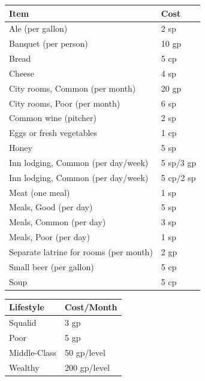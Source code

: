 \begin{multicols}{2}
\noindent
\begin{minipage}{\columnwidth}

\label{provisions}
\noindent
\begin{tabular}{|p{}|p{}|}
\hline
Item				& Cost \\
\hline\hline
\rowcolor[gray]{.9}Ale (per gallon)		& 2 sp \\
Banquet (per person)	& 10 gp \\
\rowcolor[gray]{.9}Bread					& 5 cp \\
Cheese					& 4 sp \\
\rowcolor[gray]{.9}City rooms, Common (per month)		& 20 gp \\
City rooms, Poor (per month)		& 6 sp \\
\rowcolor[gray]{.9}Common wine (pitcher)				& 2 sp \\
Eggs or fresh vegetables			& 1 cp \\
\rowcolor[gray]{.9}Honey					& 5 sp \\
Inn lodging, Common (per day/week)	& 5 sp/3 gp \\
\rowcolor[gray]{.9}Inn lodging, Common (per day/week)	& 5 cp/2 sp \\
Meat (one meal)			& 1 sp \\
\rowcolor[gray]{.9}Meals, Good (per day)	& 5 sp \\
Meals, Common (per day)	& 3 sp \\
\rowcolor[gray]{.9}Meals, Poor (per day)	& 1 sp \\
Separate latrine for rooms (per month)	& 2 gp \\
\rowcolor[gray]{.9}Small beer (per gallon)	& 5 cp \\
Soup					& 5 cp \\
\hline
\end{tabular}

\end{minipage}

\noindent
\begin{minipage}{\columnwidth}

\label{livingconditions}
\noindent
\begin{tabular}{|p{}|p{}|}
\hline
Lifestyle	& Cost/Month \\
\hline\hline
\rowcolor[gray]{.9}Squalid		& 3 gp \\
Poor		& 5 gp \\
\rowcolor[gray]{.9}Middle-Class	& 50 gp/level \\
Wealthy		& 200 gp/level \\
\hline
\end{tabular}


\end{minipage}
\end{multicols}
